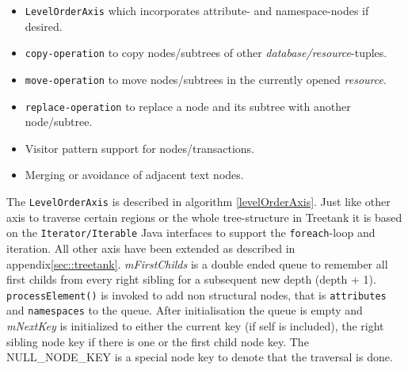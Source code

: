 \begin{itemize}
\item \texttt{LevelOrderAxis} which incorporates attribute- and namespace-nodes if desired.
\item \texttt{copy-operation} to copy nodes/subtrees of other \emph{database/resource}-tuples.
\item \texttt{move-operation} to move nodes/subtrees in the currently opened \emph{resource}.
\item \texttt{replace-operation} to replace a node and its subtree with another node/subtree.
\item Visitor pattern support for nodes/transactions.
\item Merging or avoidance of adjacent text nodes.
\end{itemize}

The \texttt{LevelOrderAxis} is described in algorithm \ref{levelOrderAxis}. Just like other axis to traverse certain regions or the whole tree-structure in Treetank it is based on the \texttt{Iterator/Iterable} Java interfaces to support the \texttt{foreach}-loop and iteration. All other axis have been extended as described in appendix\ref{sec::treetank}. \emph{mFirstChilds} is a double ended queue to remember all first childs from every right sibling for a subsequent new depth (depth + 1). \texttt{processElement()} is invoked to add non structural nodes, that is \texttt{attributes} and \texttt{namespaces} to the queue. After initialisation the queue is empty and \emph{mNextKey} is initialized to either the current key (if self is included), the right sibling node key if there is one or the first child node key. The NULL\_NODE\_KEY is a special node key to denote that the traversal is done.

